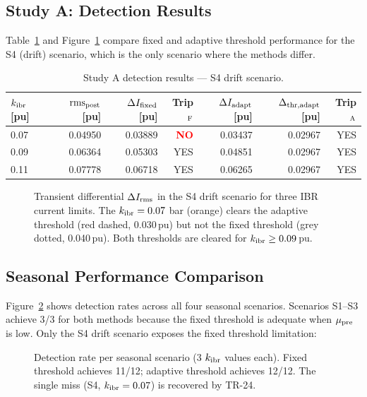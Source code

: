 \documentclass[11pt,a4paper]{article}
\begin{document}
\subsection{Study A: Detection Results}

Table~\ref{tab:detection} and Figure~\ref{fig:detection} compare fixed and
adaptive threshold performance for the S4 (drift) scenario, which is the
only scenario where the methods differ.

\begin{table}[h!]
\centering
\caption{Study A detection results — S4 drift scenario.}
\label{tab:detection}
\begin{tabular}{lrrrrrr}
\toprule
$k_{\rm ibr}$ [pu]
  & $\mathrm{rms}_{\rm post}$ [pu]
  & $\Delta I_{\rm fixed}$ [pu] & Trip$_{\rm F}$
  & $\Delta I_{\rm adapt}$ [pu] & $\Delta_{\rm thr,adapt}$ [pu] & Trip$_{\rm A}$ \\
\midrule
0.07 & 0.04950 & 0.03889 & \textcolor{red}{\textbf{NO}}  & 0.03437 & 0.02967 & YES \\
0.09 & 0.06364 & 0.05303 & YES  & 0.04851 & 0.02967 & YES \\
0.11 & 0.07778 & 0.06718 & YES  & 0.06265 & 0.02967 & YES \\
\bottomrule
\end{tabular}
\end{table}

\begin{figure}[h!]
  \centering
  
  \caption{Transient differential $\Delta I_{\rm rms}$ in the S4 drift
           scenario for three IBR current limits.  The $k_{\rm ibr}=0.07$ bar
           (orange) clears the adaptive threshold (red dashed, 0.030\,pu) but
           not the fixed threshold (grey dotted, 0.040\,pu).  Both thresholds
           are cleared for $k_{\rm ibr}\geq 0.09$\,pu.}
  \label{fig:detection}
\end{figure}

\subsection{Seasonal Performance Comparison}

Figure~\ref{fig:seasonal} shows detection rates across all four seasonal
scenarios.  Scenarios S1--S3 achieve 3/3 for both methods because the
fixed threshold is adequate when $\mu_{\rm pre}$ is low.  Only the S4 drift
scenario exposes the fixed threshold limitation:

\begin{figure}[h!]
  \centering
  
  \caption{Detection rate per seasonal scenario (3 $k_{\rm ibr}$ values each).
           Fixed threshold achieves 11/12; adaptive threshold achieves 12/12.
           The single miss (S4, $k_{\rm ibr}=0.07$) is recovered by TR-24.}
  \label{fig:seasonal}
\end{figure}
\end{document}
